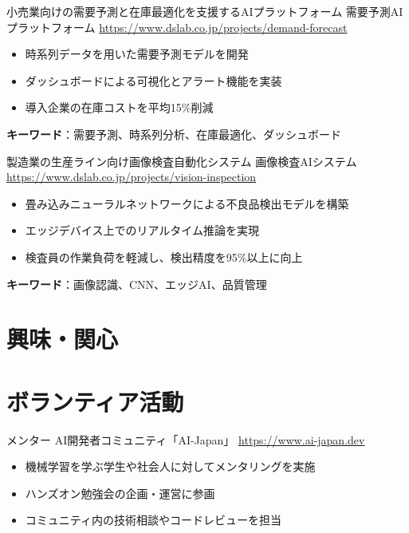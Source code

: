 \documentclass[a4paper, serif, 10pt]{moderncv}
\begin{document}
        {小売業向けの需要予測と在庫最適化を支援するAIプラットフォーム}
        {需要予測AIプラットフォーム}
        {\url{https://www.dslab.co.jp/projects/demand-forecast}}
        {}
        {\begin{itemize}
\item 時系列データを用いた需要予測モデルを開発
\item ダッシュボードによる可視化とアラート機能を実装
\item 導入企業の在庫コストを平均15\%削減
\end{itemize}
\textbf{キーワード}：需要予測、時系列分析、在庫最適化、ダッシュボード}

        {製造業の生産ライン向け画像検査自動化システム}
        {画像検査AIシステム}
        {\url{https://www.dslab.co.jp/projects/vision-inspection}}
        {}
        {\begin{itemize}
\item 畳み込みニューラルネットワークによる不良品検出モデルを構築
\item エッジデバイス上でのリアルタイム推論を実現
\item 検査員の作業負荷を軽減し、検出精度を95\%以上に向上
\end{itemize}
\textbf{キーワード}：画像認識、CNN、エッジAI、品質管理}
\section{興味・関心}

\section{ボランティア活動}

        {メンター}
        {AI開発者コミュニティ「AI-Japan」}
        {\url{https://www.ai-japan.dev}}
        {}
        {\begin{itemize}
\item 機械学習を学ぶ学生や社会人に対してメンタリングを実施
\item ハンズオン勉強会の企画・運営に参画
\item コミュニティ内の技術相談やコードレビューを担当
\end{itemize}}
    
\end{document}
